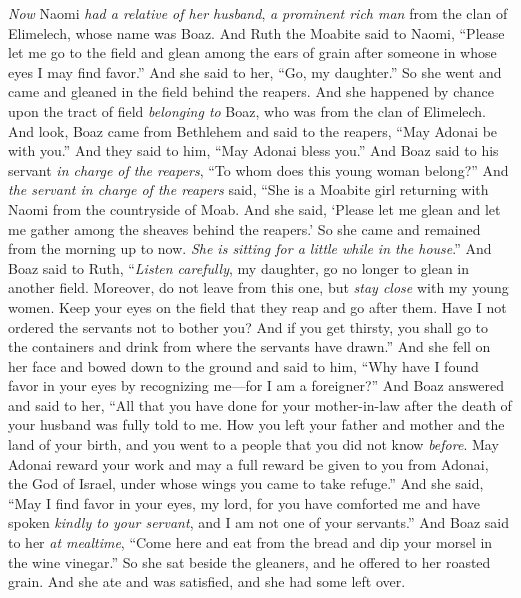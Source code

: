 \begin{biblechapter} %
 \textit{Now} Naomi \textit{had a relative of her husband}, \textit{a prominent rich man} from the clan of Elimelech, whose name was Boaz.
\verse And Ruth the Moabite said to Naomi, “Please let me go to the field and glean among the ears of grain after someone in whose eyes I may find favor.” And she said to her, “Go, my daughter.”
\verse So she went and came and gleaned in the field behind the reapers. And she happened by chance upon the tract of field \textit{belonging to} Boaz, who was from the clan of Elimelech.
\verse And look, Boaz came from Bethlehem and said to the reapers, “May Adonai be with you.” And they said to him, “May Adonai bless you.”
\verse And Boaz said to his servant \textit{in charge of the reapers}, “To whom does this young woman belong?”
\verse And \textit{the servant in charge of the reapers} said, “She is a Moabite girl returning with Naomi from the countryside of Moab.
\verse And she said, ‘Please let me glean and let me gather among the sheaves behind the reapers.’ So she came and remained from the morning up to now. \textit{She is sitting for a little while in the house}.”
\verse And Boaz said to Ruth, “\textit{Listen carefully}, my daughter, go no longer to glean in another field. Moreover, do not leave from this one, but \textit{stay close} with my young women.
\verse Keep your eyes on the field that they reap and go after them. Have I not ordered the servants not to bother you? And if you get thirsty, you shall go to the containers and drink from where the servants have drawn.”
\verse And she fell on her face and bowed down to the ground and said to him, “Why have I found favor in your eyes by recognizing me—for I am a foreigner?”
\verse And Boaz answered and said to her, “All that you have done for your mother-in-law after the death of your husband was fully told to me. How you left your father and mother and the land of your birth, and you went to a people that you did not know \textit{before}.
\verse May Adonai reward your work and may a full reward be given to you from Adonai, the God of Israel, under whose wings you came to take refuge.”
\verse And she said, “May I find favor in your eyes, my lord, for you have comforted me and have spoken \textit{kindly to your servant}, and I am not one of your servants.”
\verse And Boaz said to her \textit{at mealtime}, “Come here and eat from the bread and dip your morsel in the wine vinegar.” So she sat beside the gleaners, and he offered to her roasted grain. And she ate and was satisfied, and she had some left over.

\end{biblechapter}
